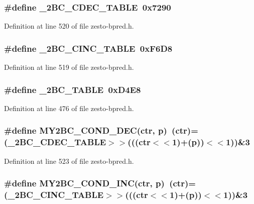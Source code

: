 \subsubsection[{\_\-2BC\_\-CDEC\_\-TABLE}]{\setlength{\rightskip}{0pt plus 5cm}\#define \_\-2BC\_\-CDEC\_\-TABLE~0x7290}\label{zesto-bpred_8h_d10fcd3b2e4614678abfd91a68707c45}




Definition at line 520 of file zesto-bpred.h.
\subsubsection[{\_\-2BC\_\-CINC\_\-TABLE}]{\setlength{\rightskip}{0pt plus 5cm}\#define \_\-2BC\_\-CINC\_\-TABLE~0xF6D8}\label{zesto-bpred_8h_19d6e1d2a8ba2f79e7568a8c6dfbdbab}




Definition at line 519 of file zesto-bpred.h.
\subsubsection[{\_\-2BC\_\-TABLE}]{\setlength{\rightskip}{0pt plus 5cm}\#define \_\-2BC\_\-TABLE~0xD4E8}\label{zesto-bpred_8h_b0d3c7f383a6a35b0feb0b7b9bb8faa2}




Definition at line 476 of file zesto-bpred.h.
\subsubsection[{MY2BC\_\-COND\_\-DEC}]{\setlength{\rightskip}{0pt plus 5cm}\#define MY2BC\_\-COND\_\-DEC(ctr, \/  p)~(ctr)=(\_\-2BC\_\-CDEC\_\-TABLE$>$$>$(((ctr$<$$<$1)+(p))$<$$<$1))\&3}\label{zesto-bpred_8h_861d9cdb4f798747ffb4b10321f430d3}




Definition at line 523 of file zesto-bpred.h.
\subsubsection[{MY2BC\_\-COND\_\-INC}]{\setlength{\rightskip}{0pt plus 5cm}\#define MY2BC\_\-COND\_\-INC(ctr, \/  p)~(ctr)=(\_\-2BC\_\-CINC\_\-TABLE$>$$>$(((ctr$<$$<$1)+(p))$<$$<$1))\&3}\label{zesto-bpred_8h_dc5a79b5bebc786c728da4737d2ac6ff}




